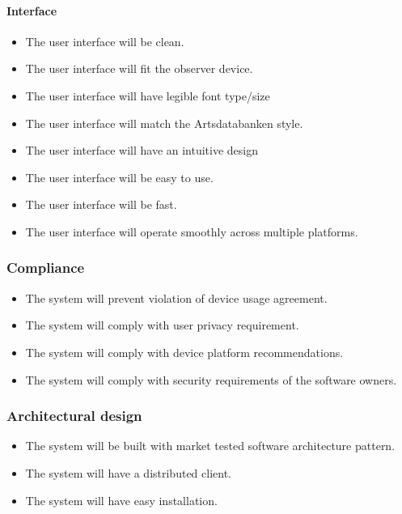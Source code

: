     \paragraph{Interface}
        \begin{itemize}
            \item The user interface will be clean.
            \item The user interface will fit the observer device.
            \item The user interface will have legible font type/size
            \item The user interface will match the Artsdatabanken style.
            \item The user interface will have an intuitive design
            \item The user interface will be easy to use.
            \item The user interface will be fast.
            \item The user interface will operate smoothly across multiple platforms.

        \end{itemize}
\subsubsection{Compliance}
		\begin{itemize}
		     \item The system will prevent violation of device usage agreement.
             \item The system will comply with user privacy requirement.
             \item The system will comply with device platform recommendations.
             \item The system will comply with security requirements of the software owners.
	    \end{itemize}
\subsubsection{Architectural design}
    \begin{itemize}
        \item The system will be built with market tested software architecture pattern.
        \item The system will have a distributed client.
        \item The system will have easy installation.

    \end{itemize}
